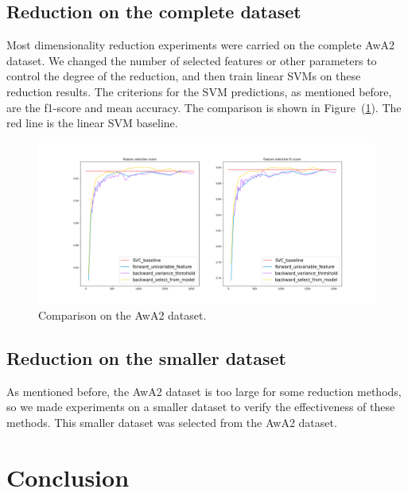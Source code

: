 \documentclass{article}
\begin{document}
\subsection{Reduction on the complete dataset}
Most dimensionality reduction experiments were carried on the complete AwA2 dataset. We changed the number of selected features or other parameters to control the degree of the reduction, and then train linear SVMs on these reduction results. The criterions for the SVM predictions, as mentioned before, are the f1-score and mean accuracy. The comparison is shown in Figure~(\ref{fig:complete}). The red line is the linear SVM baseline.
  \begin{figure}
  	\label{fig:complete}
  	\caption{Comparison on the AwA2 dataset.}
  	\includegraphics[width=\linewidth]{figs/feature_selection.png}
  \end{figure}

\subsection{Reduction on the smaller dataset}
As mentioned before, the AwA2 dataset is too large for some reduction methods, so we made experiments on a smaller dataset to verify the effectiveness of these methods. This smaller dataset was selected from the AwA2 dataset.

\section{Conclusion}

  

\end{document}
